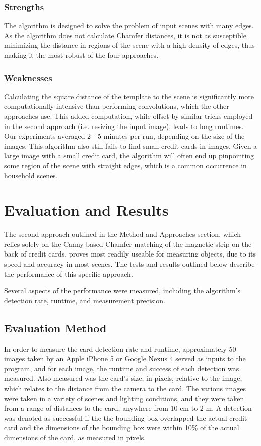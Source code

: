 \documentclass[10pt,twocolumn,letterpaper]{article}
\begin{document}
\subsubsection{Strengths}
	The algorithm is designed to solve the problem of input scenes with many edges. As the algorithm does not calculate Chamfer distances, it is not as susceptible minimizing the distance in regions of the scene with a high density of edges, thus making it the most robust of the four approaches. 
\subsubsection{Weaknesses}
	Calculating the square distance of the template to the scene is significantly more computationally intensive than performing convolutions, which the other approaches use. This added computation, while offset by similar tricks employed in the second approach (i.e. resizing the input image), leads to long runtimes. Our experiments averaged 2 - 5 minutes per run, depending on the size of the images.
	This algorithm also still fails to find small credit cards in images. Given a large image with a small credit card, the algorithm will often end up pinpointing some region of the scene with straight edges, which is a common occurrence in household scenes. 
	
\section{Evaluation and Results}
The second approach outlined in the Method and Approaches section, which relies solely on the Canny-based Chamfer matching of the magnetic strip on the back of credit cards, proves most readily useable for measuring objects, due to its speed and accuracy in most scenes. The tests and results outlined below describe the performance of this specific approach. 

Several aspects of the performance were measured, including the algorithm’s detection rate, runtime, and measurement precision.

\subsection{Evaluation Method}
	In order to measure the card detection rate and runtime, approximately 50 images taken by an Apple iPhone 5 or Google Nexus 4 served as inputs to the program, and for each image, the runtime and success of each detection was measured. Also measured was the card’s size, in pixels, relative to the image, which relates to the distance from the camera to the card. The various images were taken in a variety of scenes and lighting conditions, and they were taken from a range of distances to the card, anywhere from 10 cm to 2 m. A detection was denoted as successful if the the bounding box overlapped the actual credit card and the dimensions of the bounding box were within 10\% of the actual dimensions of the card, as measured in pixels. 
\end{document}
